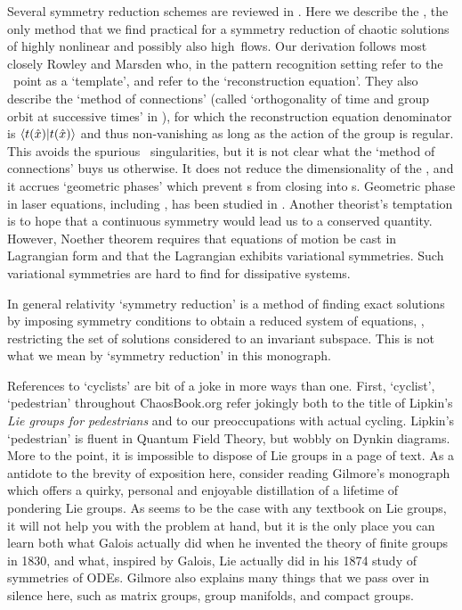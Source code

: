 \documentclass[12pt]{article}
\begin{document}
{ Several symmetry
reduction schemes are reviewed in . Here we
describe the
\mslices{}, the
only method that we find practical for a symmetry reduction of
chaotic solutions of highly nonlinear and possibly also high\dmn\ flows.
Our derivation follows most closely
Rowley and Marsden who, in the
pattern recognition setting refer to the \slice\ point as a
`template', and refer to the `reconstruction
equation'. They also describe the `method
of connections' (called `orthogonality of time and group
orbit at successive times' in ), for which the
reconstruction equation denominator is
$\braket{\groupTan(\sspRed)} {\groupTan(\sspRed)}$ and thus
non-vanishing as long as the action of the group is regular.
This avoids the spurious \slice\ singularities, but it is not
clear what the `method of connections' buys us otherwise. It
does not reduce the dimensionality of the \statesp, and it
accrues `geometric phases' which prevent \rpo s from closing
into \po s.
Geometric phase in laser equations, including \cLe,
has been studied in
.
Another theorist's temptation is to hope that a continuous
symmetry would lead us to a conserved quantity. However,
Noether theorem requires that equations of motion be cast in
Lagrangian form and that the Lagrangian exhibits variational
symmetries. Such variational
symmetries are hard to find for dissipative systems.

In general relativity `symmetry reduction' is a method of finding exact
solutions by imposing symmetry conditions to obtain a reduced system of
equations, \ie, restricting the set of solutions considered to an
invariant subspace. This is not what we mean by `symmetry reduction'
in this monograph.

References to `cyclists'
are bit of a joke in more ways than one.
First, `cyclist',
`pedestrian' throughout ChaosBook.org refer jokingly both to
the title of Lipkin's {\em Lie groups for
pedestrians} and to our preoccupations with
     {actual cycling}. Lipkin's `pedestrian' is fluent in
Quantum Field Theory, but wobbly on Dynkin diagrams. More to the point,
it is impossible to dispose of Lie groups in a page of text.
As a antidote to the brevity of exposition here,
consider reading
Gilmore's monograph which offers a quirky, personal and
enjoyable distillation of a lifetime of pondering Lie groups. As seems to
be the case with any textbook on Lie groups, it will not help you with
the problem at hand, but it is the only place you can learn both what
Galois actually did when he invented the theory of finite groups in 1830,
and what, inspired by Galois, Lie actually did in his 1874 study of
symmetries of ODEs. Gilmore also explains many things that we pass over
in silence here, such as matrix groups, group manifolds, and compact
groups.

}
\end{document}
